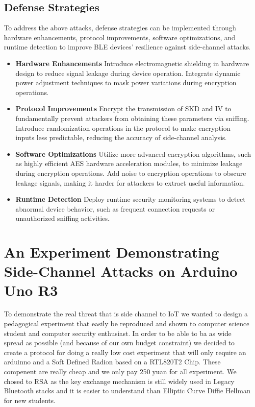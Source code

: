 \documentclass{article}
\begin{document}
\subsection{Defense Strategies}
To address the above attacks, defense strategies can be implemented through hardware enhancements, protocol improvements, software optimizations, and runtime detection to improve BLE devices' resilience against side-channel attacks.
\begin{itemize}
    \item \textbf{Hardware Enhancements}  
    Introduce electromagnetic shielding in hardware design to reduce signal leakage during device operation. Integrate dynamic power adjustment techniques to mask power variations during encryption operations.

    \item \textbf{Protocol Improvements}  
    Encrypt the transmission of SKD and IV to fundamentally prevent attackers from obtaining these parameters via sniffing. Introduce randomization operations in the protocol to make encryption inputs less predictable, reducing the accuracy of side-channel analysis.

    \item \textbf{Software Optimizations}  
    Utilize more advanced encryption algorithms, such as highly efficient AES hardware acceleration modules, to minimize leakage during encryption operations. Add noise to encryption operations to obscure leakage signals, making it harder for attackers to extract useful information.

    \item \textbf{Runtime Detection}  
    Deploy runtime security monitoring systems to detect abnormal device behavior, such as frequent connection requests or unauthorized sniffing activities.
\end{itemize}

\section{An Experiment Demonstrating Side-Channel Attacks on Arduino Uno R3}
To demonstrate the real threat that is side channel to IoT we wanted to design a pedagogical experiment that easily be reproduced and shown to computer science student and computer security enthusiast. In order to be able to ba as wide spread as possible (and because of our own budget constraint) we decided to create a protocol for doing a really low cost experiment that will only require an arduinno and a Soft Defined Radion based on a RTL820T2 Chip. These compenent are really cheap and we only pay 250 yuan for all experiment. We chosed to RSA as the key exchange mechanism is still widely used in Legacy Bluetooth stacks and it is easier to understand than Elliptic Curve Diffie Hellman for new students.
\end{document}
